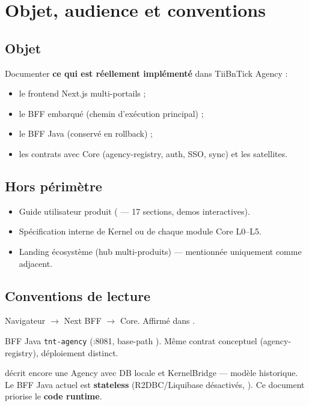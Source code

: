 \chapter{Objet, audience et conventions}

\section{Objet}

Documenter \textbf{ce qui est réellement implémenté} dans TiiBnTick Agency :
\begin{itemize}
  \item le frontend Next.js multi-portails ;
  \item le BFF embarqué  (chemin d'exécution principal) ;
  \item le BFF Java  (conservé en rollback) ;
  \item les contrats avec Core (agency-registry, auth, SSO, sync) et les satellites.
\end{itemize}

\section{Hors périmètre}

\begin{itemize}
  \item Guide utilisateur produit ( --- 17 sections, demos interactives).
  \item Spécification interne de Kernel ou de chaque module Core L0--L5.
  \item Landing écosystème  (hub multi-produits) --- mentionnée
        uniquement comme adjacent.
\end{itemize}

\section{Conventions de lecture}

\begin{description}[style=nextline]
  \item[Runtime actuel]
    Navigateur $\rightarrow$ Next BFF $\rightarrow$ Core. Affirmé dans
    .
  \item[Rollback]
    BFF Java \texttt{tnt-agency} (:8081, base-path ). Même contrat
    conceptuel (agency-registry), déploiement distinct.
  \item[Écart documentaire]
     décrit encore une Agency avec
    DB locale et KernelBridge --- modèle historique. Le BFF Java actuel est
    \textbf{stateless} (R2DBC/Liquibase désactivés, ).
    Ce document priorise le \textbf{code runtime}.
\end{description}

